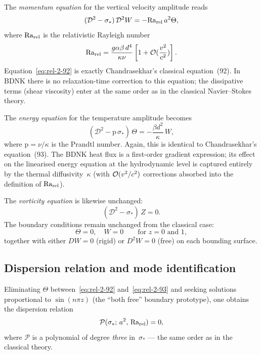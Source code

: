 The \emph{momentum equation} for the vertical velocity amplitude reads
\begin{equation}
\label{eq:rel-2-92}
(\mathcal{D}^2 - \sigma_*)\,\mathcal{D}^2 W
= -\mathrm{Ra}_{\mathrm{rel}}\, a^2 \Theta,
\end{equation}
where $\mathrm{Ra}_{\mathrm{rel}}$ is the relativistic Rayleigh number
\begin{equation}
\label{eq:rel-Rayleigh}
\mathrm{Ra}_{\mathrm{rel}} = \frac{g\alpha\beta\, d^4}{\kappa\nu}
  \left[1 + \mathcal{O}(\frac{v^2}{c^2})\right].
\end{equation}
Equation~\eqref{eq:rel-2-92} is exactly Chandrasekhar's classical
equation~(92).  In BDNK there is no relaxation-time correction to this
equation; the dissipative terms (shear viscosity) enter at the same order
as in the classical Navier--Stokes theory.

The \emph{energy equation} for the temperature amplitude becomes
\begin{equation}
\label{eq:rel-2-93}
(\mathcal{D}^2 - \mathrm{p}\,\sigma_*)\,\Theta
= -\frac{\beta d^2}{\kappa}\, W,
\end{equation}
where $\mathrm{p} = \nu/\kappa$ is the Prandtl number.  Again, this is
identical to Chandrasekhar's equation~(93).  The BDNK heat flux is a
first-order gradient expression; its effect on the linearised energy
equation at the hydrodynamic level is captured entirely by the thermal
diffusivity~$\kappa$ (with $\mathcal{O}(v^2/c^2)$ corrections absorbed into the
definition of $\mathrm{Ra}_{\mathrm{rel}}$).

The \emph{vorticity equation} is likewise unchanged:
\begin{equation}
\label{eq:rel-2-94}
(\mathcal{D}^2 - \sigma_*)\, Z = 0.
\end{equation}
The boundary conditions remain unchanged from the classical case:
\begin{equation}
\label{eq:rel-2-95}
\Theta = 0, \quad W = 0 \qquad\text{for } z = 0 \text{ and } 1,
\end{equation}
together with either $DW = 0$ (rigid) or $D^2 W = 0$ (free) on each
bounding surface.

\subsection{Dispersion relation and mode identification}
\label{sec:rel-10c}

Eliminating $\Theta$ between~\eqref{eq:rel-2-92} and~\eqref{eq:rel-2-93}
and seeking solutions proportional to $\sin(n\pi z)$ (the ``both free''
boundary prototype), one obtains the dispersion relation
\begin{equation}
\label{eq:rel-dispersion-benard}
\mathcal{P}(\sigma_*;\, a^2,\, \mathrm{Ra}_{\mathrm{rel}}) = 0,
\end{equation}
where $\mathcal{P}$ is a polynomial of degree \emph{three} in~$\sigma_*$
--- the same order as in the classical theory.

